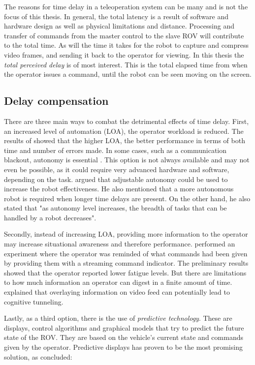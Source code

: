 
\clearpage

The reasons for time delay in a teleoperation system can be many and is not the focus of this thesis. In general, the total latency is a result of software and hardware design as well as physical limitations and distance.
Processing and transfer of commands from the master control to the slave ROV will contribute to the total time. As will the time it takes for the robot to capture and compress video frames, and sending it back to the operator for viewing. 
In this thesis the \emph{total perceived delay} is of most interest. This is the total elapsed time from when the operator issues a command, until the robot can be seen moving on the screen.

\subsection{Delay compensation}

There are three main ways to combat the detrimental effects of time delay. First, an increased level of automation (LOA), the operator workload is reduced. The results of \citet{Luck2006} showed that the higher LOA, the better performance in terms of both time and number of errors made. In some cases, such as a communication blackout, autonomy is essential \citep{Dorais1999}. This option is not always available and may not even be possible, as it could require very advanced hardware and software, depending on the task. \citet{Goodrich2001} argued that adjustable autonomy could be used to increase the robot effectiveness. He also mentioned that a more autonomous robot is required when longer time delays are present. On the other hand, he also stated that "as autonomy level increases, the breadth of tasks that can be handled by a robot decreases".

Secondly, instead of increasing LOA, providing more information to the operator may increase situational awareness and therefore performance. \citet{Miller2005} performed an experiment where the operator was reminded of what commands had been given by providing them with a streaming command indicator. The preliminary results showed that the operator reported lower fatigue levels. But there are limitations to how much information an operator can digest in a finite amount of time. \citet{Chen2007} explained that overlaying information on video feed can potentially lead to cognitive tunneling.

Lastly, as a third option, there is the use of \emph{predictive technology}. These are displays, control algorithms and graphical models that try to predict the future state of the ROV. They are based on the vehicle's current state and commands given by the operator. Predictive displays has proven to be the most promising solution, as \citet{Chen2007} concluded:

